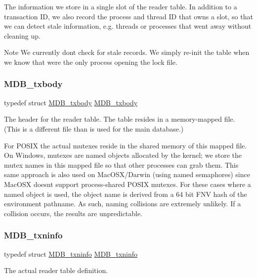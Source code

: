 The information we store in a single slot of the reader table. In addition to a transaction ID, we also record the process and thread ID that owns a slot, so that we can detect stale information, e.\+g. threads or processes that went away without cleaning up. \begin{DoxyNote}{Note}
We currently don\textquotesingle{}t check for stale records. We simply re-\/init the table when we know that we\textquotesingle{}re the only process opening the lock file. 
\end{DoxyNote}
\mbox{\label{group__readers_ga190cd27d9867f4ec4f26c33ff63cac59}} 
\subsubsection{\texorpdfstring{M\+D\+B\+\_\+txbody}{MDB\_txbody}}
{\footnotesize\ttfamily typedef struct \mbox{\hyperlink{struct_m_d_b__txbody}{M\+D\+B\+\_\+txbody}}  \mbox{\hyperlink{struct_m_d_b__txbody}{M\+D\+B\+\_\+txbody}}}

The header for the reader table. The table resides in a memory-\/mapped file. (This is a different file than is used for the main database.)

For P\+O\+S\+IX the actual mutexes reside in the shared memory of this mapped file. On Windows, mutexes are named objects allocated by the kernel; we store the mutex names in this mapped file so that other processes can grab them. This same approach is also used on Mac\+O\+S\+X/\+Darwin (using named semaphores) since Mac\+O\+SX doesn\textquotesingle{}t support process-\/shared P\+O\+S\+IX mutexes. For these cases where a named object is used, the object name is derived from a 64 bit F\+NV hash of the environment pathname. As such, naming collisions are extremely unlikely. If a collision occurs, the results are unpredictable. \mbox{\label{group__readers_ga32aadb60ce01bc428cc35a76ed6ed3d6}} 
\subsubsection{\texorpdfstring{M\+D\+B\+\_\+txninfo}{MDB\_txninfo}}
{\footnotesize\ttfamily typedef struct \mbox{\hyperlink{struct_m_d_b__txninfo}{M\+D\+B\+\_\+txninfo}}  \mbox{\hyperlink{struct_m_d_b__txninfo}{M\+D\+B\+\_\+txninfo}}}

The actual reader table definition. 